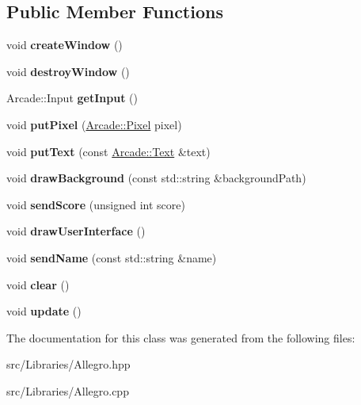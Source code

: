 \subsection*{Public Member Functions}
\begin{DoxyCompactItemize}
\item 
\mbox{\label{class_arcade_1_1_allegro_ad9b199f394b561e6e2c5a7c010d4e594}} 
void {\bfseries create\+Window} ()
\item 
\mbox{\label{class_arcade_1_1_allegro_a7e02624a95c302739bd0782e96b84693}} 
void {\bfseries destroy\+Window} ()
\item 
\mbox{\label{class_arcade_1_1_allegro_a01c39163297a7c7aeb35b0755a7de018}} 
Arcade\+::\+Input {\bfseries get\+Input} ()
\item 
\mbox{\label{class_arcade_1_1_allegro_a1c43b5ab81820516cbebab119663c441}} 
void {\bfseries put\+Pixel} (\mbox{\hyperlink{struct_arcade_1_1_pixel}{Arcade\+::\+Pixel}} pixel)
\item 
\mbox{\label{class_arcade_1_1_allegro_a3366658db0da0594430c284b4a180d41}} 
void {\bfseries put\+Text} (const \mbox{\hyperlink{struct_arcade_1_1_text}{Arcade\+::\+Text}} \&text)
\item 
\mbox{\label{class_arcade_1_1_allegro_a7437f5e92431f00ef1a8017894197d1f}} 
void {\bfseries draw\+Background} (const std\+::string \&background\+Path)
\item 
\mbox{\label{class_arcade_1_1_allegro_a260f5796d4df003735aaf8dad89f21d9}} 
void {\bfseries send\+Score} (unsigned int score)
\item 
\mbox{\label{class_arcade_1_1_allegro_a30d1da33c9b8f9c3511b3198efac4423}} 
void {\bfseries draw\+User\+Interface} ()
\item 
\mbox{\label{class_arcade_1_1_allegro_a7317e4d461d8d6b0f5adf4ea66e84374}} 
void {\bfseries send\+Name} (const std\+::string \&name)
\item 
\mbox{\label{class_arcade_1_1_allegro_aaaefc5e5981661c909eb06e0539370d3}} 
void {\bfseries clear} ()
\item 
\mbox{\label{class_arcade_1_1_allegro_a22460ef91180dd139a9d89f6800d79d4}} 
void {\bfseries update} ()
\end{DoxyCompactItemize}


The documentation for this class was generated from the following files\+:\begin{DoxyCompactItemize}
\item 
src/\+Libraries/Allegro.\+hpp\item 
src/\+Libraries/Allegro.\+cpp\end{DoxyCompactItemize}
